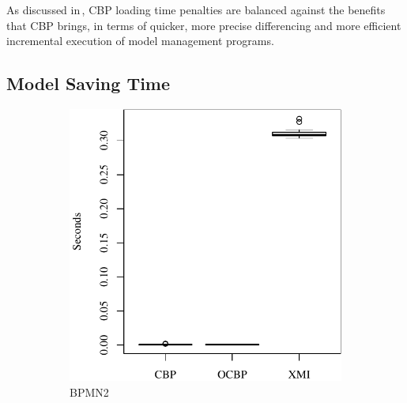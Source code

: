 \documentclass{llncs}
\begin{document}
    As discussed in\,\cite{yohannis2017turning}, CBP loading time penalties are balanced against the benefits that CBP brings, in terms of quicker, more precise differencing and more efficient incremental execution of model management programs.
    
    \subsection{Model Saving Time}
    \label{subsec:saving_time_test}
    
    
    
    \begin{figure}[ht]
        \begin{subfigure}{0.325\textwidth}
            \centering
            \includegraphics[width=\linewidth]{images/save_time_bpmn2}
            \caption{BPMN2}
            \label{fig:save_time_bpmn2}
        \end{subfigure}
        \hfill
        \begin{subfigure}{0.325\textwidth}
            \centering

\end{subfigure}
\end{figure}
\end{document}
